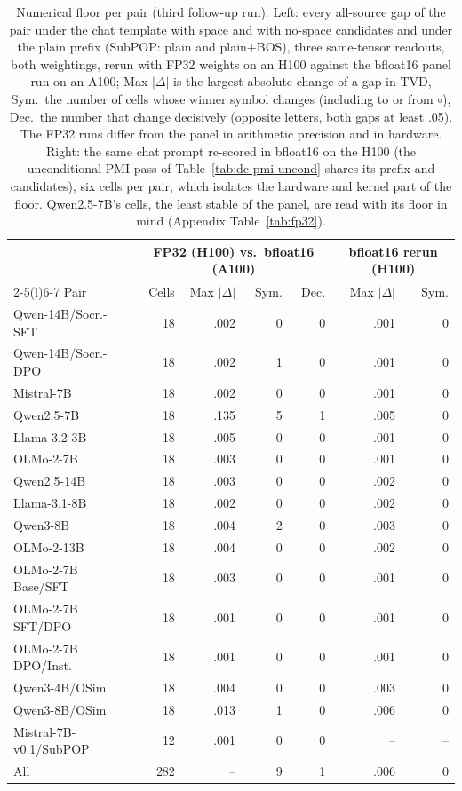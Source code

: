 \begin{table}[t]
\centering\scriptsize
\setlength{\tabcolsep}{2.5pt}
\begin{tabular}{@{}lrrrrrr@{}}
\toprule
& \multicolumn{4}{c}{FP32 (H100) vs.\ bfloat16 (A100)} & \multicolumn{2}{c}{bfloat16 rerun (H100)} \\
\cmidrule(lr){2-5}\cmidrule(l){6-7}
Pair & Cells & Max $|\Delta|$ & Sym. & Dec. & Max $|\Delta|$ & Sym. \\
\midrule
Qwen-14B/Socr.-SFT & 18 & .002 & 0 & 0 & .001 & 0 \\
Qwen-14B/Socr.-DPO & 18 & .002 & 1 & 0 & .001 & 0 \\
Mistral-7B & 18 & .002 & 0 & 0 & .001 & 0 \\
Qwen2.5-7B & 18 & .135 & 5 & 1 & .005 & 0 \\
Llama-3.2-3B & 18 & .005 & 0 & 0 & .001 & 0 \\
OLMo-2-7B & 18 & .003 & 0 & 0 & .001 & 0 \\
Qwen2.5-14B & 18 & .003 & 0 & 0 & .002 & 0 \\
Llama-3.1-8B & 18 & .002 & 0 & 0 & .002 & 0 \\
Qwen3-8B & 18 & .004 & 2 & 0 & .003 & 0 \\
OLMo-2-13B & 18 & .004 & 0 & 0 & .002 & 0 \\
OLMo-2-7B Base/SFT & 18 & .003 & 0 & 0 & .001 & 0 \\
OLMo-2-7B SFT/DPO & 18 & .001 & 0 & 0 & .001 & 0 \\
OLMo-2-7B DPO/Inst. & 18 & .001 & 0 & 0 & .001 & 0 \\
Qwen3-4B/OSim & 18 & .004 & 0 & 0 & .003 & 0 \\
Qwen3-8B/OSim & 18 & .013 & 1 & 0 & .006 & 0 \\
Mistral-7B-v0.1/SubPOP & 12 & .001 & 0 & 0 & -- & -- \\
\midrule
All & 282 & -- & 9 & 1 & .006 & 0 \\
\bottomrule
\end{tabular}
\caption{Numerical floor per pair (third follow-up run). Left: every all-source gap of the pair under the chat template with space and with no-space candidates and under the plain prefix (SubPOP: plain and plain+BOS), three same-tensor readouts, both weightings, rerun with FP32 weights on an H100 against the bfloat16 panel run on an A100; Max $|\Delta|$ is the largest absolute change of a gap in TVD, Sym.\ the number of cells whose winner symbol changes (including to or from $\circ$), Dec.\ the number that change decisively (opposite letters, both gaps at least .05). The FP32 runs differ from the panel in arithmetic precision and in hardware. Right: the same chat prompt re-scored in bfloat16 on the H100 (the unconditional-PMI pass of Table~\ref{tab:dc-pmi-uncond} shares its prefix and candidates), six cells per pair, which isolates the hardware and kernel part of the floor. Qwen2.5-7B's cells, the least stable of the panel, are read with its floor in mind (Appendix Table~\ref{tab:fp32}).}
\label{tab:fp32-all}
\end{table}
